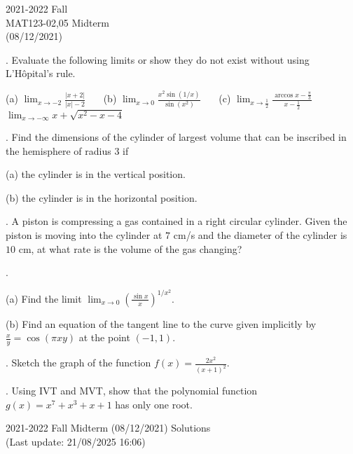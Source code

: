 \documentclass{article}
\begin{document}
\pagestyle{empty}
\large

\begin{center}
2021-2022 Fall\\MAT123-02,05 Midterm\\(08/12/2021)
\end{center}

. Evaluate the following limits or show they do not exist without using L'Hôpital's rule.

\hfill

(a) $\displaystyle \lim_{x\to-2}\frac{\left|x+2\right|}{\left|x\right|-2}$ \ \ \ (b) $\displaystyle\lim_{x\to0}\frac{x^2\sin(1/x)}{\sin\left(x^2\right)}$ \ \ \ (c) $\displaystyle \lim_{x\to\frac12}\frac{\arccos x- \frac\pi3}{x-\frac12}$ \ \ \ $\displaystyle\lim_{x\to-\infty}x+\sqrt{x^2-x-4}$

\hfill

. Find the dimensions of the cylinder of largest volume that can be inscribed in the hemisphere of radius $3$ if

\hfill

(a) the cylinder is in the vertical position.

\hfill

(b) the cylinder is in the horizontal position.

\hfill

. A piston is compressing a gas contained in a right circular cylinder. Given the piston is moving into the cylinder at $7 $ cm/s and the diameter of the cylinder is $10$ cm, at what rate is the volume of the gas changing?

\hfill

.

(a) Find the limit $\displaystyle\lim_{x\to0}\left(\frac{\sin x}x\right)^{1/x^2}$.

\hfill

(b) Find an equation of the tangent line to the curve given implicitly by $\displaystyle \frac xy=\cos\left(\pi xy\right)$ at the point $(-1,1)$.

\hfill

. Sketch the graph of the function $\displaystyle f(x)=\frac{2x^2}{\left(x+1\right)^2}$.

\hfill

. Using IVT and MVT, show that the polynomial function $g(x) = x^7+x^3+x+1$ has only one root.

\newpage

\begin{center}
2021-2022 Fall Midterm (08/12/2021) Solutions\\
(Last update: 21/08/2025 16:06)
\end{center}
\end{document}
